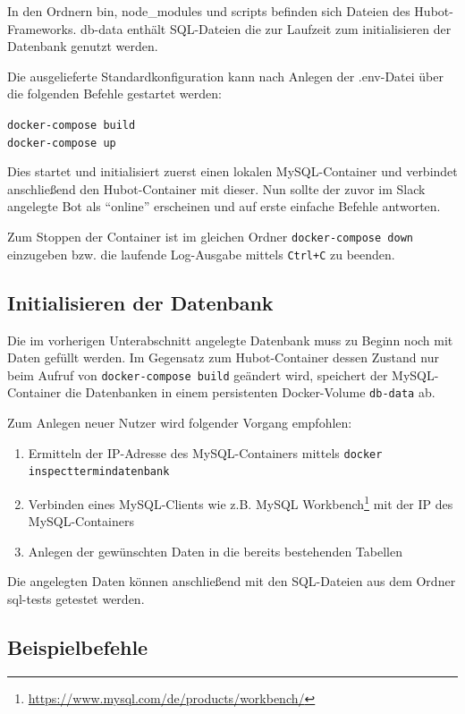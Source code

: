 In den Ordnern bin, node\_modules und scripts befinden sich Dateien des Hubot-Frameworks. db-data enthält SQL-Dateien die zur Laufzeit zum initialisieren der Datenbank genutzt werden.

Die ausgelieferte Standardkonfiguration kann nach Anlegen der .env-Datei über die folgenden Befehle gestartet werden:

\texttt{docker-compose build}\\
\texttt{docker-compose up}

Dies startet und initialisiert zuerst einen lokalen MySQL-Container und verbindet anschließend den Hubot-Container mit dieser. Nun sollte der zuvor im Slack angelegte Bot als \enquote{online} erscheinen und auf erste einfache Befehle antworten.

Zum Stoppen der Container ist im gleichen Ordner \texttt{docker-compose down} einzugeben bzw. die laufende Log-Ausgabe mittels \texttt{Ctrl+C} zu beenden.

\subsection{Initialisieren der Datenbank}
Die im vorherigen Unterabschnitt angelegte Datenbank muss zu Beginn noch mit Daten gefüllt werden. Im Gegensatz zum Hubot-Container dessen Zustand nur beim Aufruf von \texttt{docker-compose build} geändert wird, speichert der MySQL-Container die Datenbanken in einem persistenten Docker-Volume \texttt{db-data} ab.

Zum Anlegen neuer Nutzer wird folgender Vorgang empfohlen:

\begin{enumerate}
    \item Ermitteln der IP-Adresse des MySQL-Containers mittels \texttt{docker inspect\linebreak termindatenbank}
    \item Verbinden eines MySQL-Clients wie z.B. MySQL Workbench\footnote{\url{https://www.mysql.com/de/products/workbench/}} mit der IP des MySQL-Containers
    \item Anlegen der gewünschten Daten in die bereits bestehenden Tabellen
\end{enumerate}

Die angelegten Daten können anschließend mit den SQL-Dateien aus dem Ordner sql-tests getestet werden.

\subsection{Beispielbefehle}

